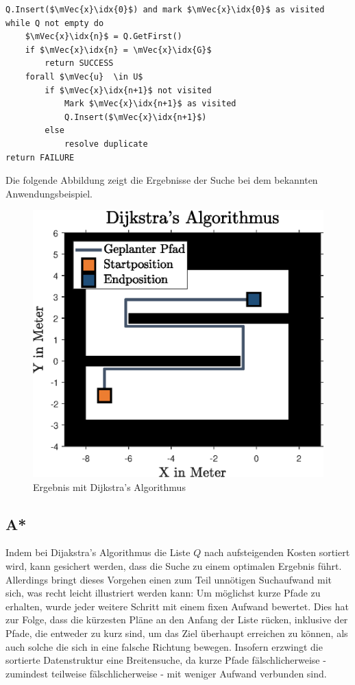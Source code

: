 \begin{lstlisting}[mathescape=true, caption={Dijkstra's Algorithmus in Pseudocode}]
Q.Insert($\mVec{x}\idx{0}$) and mark $\mVec{x}\idx{0}$ as visited
while Q not empty do
	$\mVec{x}\idx{n}$ = Q.GetFirst()
	if $\mVec{x}\idx{n} = \mVec{x}\idx{G}$
		return SUCCESS
	forall $\mVec{u}  \in U$
		if $\mVec{x}\idx{n+1}$ not visited
			Mark $\mVec{x}\idx{n+1}$ as visited
			Q.Insert($\mVec{x}\idx{n+1}$)
		else
			resolve duplicate
return FAILURE
\end{lstlisting}
Die folgende Abbildung zeigt die Ergebnisse der Suche bei dem bekannten Anwendungsbeispiel.
\begin{figure}[ht!]
\centering
\includegraphics[width=0.5\linewidth]{img/KorridorBeispiel_img6.eps}
\caption{Ergebnis mit Dijkstra's Algorithmus}
\end{figure}

\subsection{A*}
Indem bei Dijakstra's Algorithmus die Liste $Q$ nach aufsteigenden Kosten sortiert wird, kann gesichert werden, dass die Suche zu einem optimalen Ergebnis führt. Allerdings bringt dieses Vorgehen einen zum Teil unnötigen Suchaufwand mit sich, was recht leicht illustriert werden kann: Um möglichst kurze Pfade zu erhalten, wurde jeder weitere Schritt mit einem fixen Aufwand bewertet. Dies hat zur Folge, dass die kürzesten Pläne an den Anfang der Liste rücken, inklusive der Pfade, die entweder zu kurz sind, um das Ziel überhaupt erreichen zu können, als auch solche die sich in eine falsche Richtung bewegen. Insofern erzwingt die sortierte Datenstruktur eine Breitensuche, da kurze Pfade fälschlicherweise - zumindest teilweise fälschlicherweise - mit weniger Aufwand verbunden sind.

